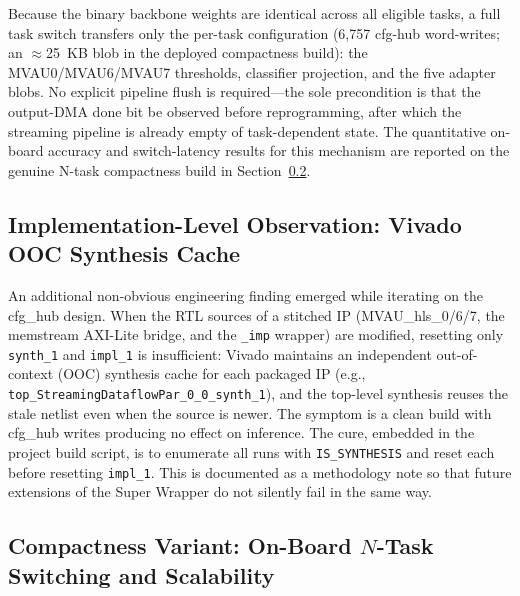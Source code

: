 \documentclass[12pt, a4paper]{report}
\numberwithin{equation}{chapter}
\numberwithin{figure}{chapter}
\numberwithin{table}{chapter}
\numberwithin{algorithm}{chapter}
\begin{document}
Because the binary backbone weights are identical across all eligible tasks, a full task switch transfers only the per-task configuration (6{,}757 cfg-hub word-writes; an $\approx$25~KB blob in the deployed compactness build): the MVAU0/MVAU6/MVAU7 thresholds, classifier projection, and the five adapter blobs. No explicit pipeline flush is required---the sole precondition is that the output-DMA done bit be observed before reprogramming, after which the streaming pipeline is already empty of task-dependent state. The quantitative on-board accuracy and switch-latency results for this mechanism are reported on the genuine N-task compactness build in Section~\ref{sec:pe1_3ds}.

\subsection{Implementation-Level Observation: Vivado OOC Synthesis Cache}

An additional non-obvious engineering finding emerged while iterating on the cfg\_hub design. When the RTL sources of a stitched IP (MVAU\_hls\_0/6/7, the memstream AXI-Lite bridge, and the \texttt{\_imp} wrapper) are modified, resetting only \texttt{synth\_1} and \texttt{impl\_1} is insufficient: Vivado maintains an independent out-of-context (OOC) synthesis cache for each packaged IP (e.g., \texttt{top\_StreamingDataflowPar\_0\_0\_synth\_1}), and the top-level synthesis reuses the stale netlist even when the source is newer. The symptom is a clean build with cfg\_hub writes producing no effect on inference. The cure, embedded in the project build script, is to enumerate all runs with \texttt{IS\_SYNTHESIS} and reset each before resetting \texttt{impl\_1}. This is documented as a methodology note so that future extensions of the Super Wrapper do not silently fail in the same way.

\subsection{Compactness Variant: On-Board \texorpdfstring{$N$}{N}-Task Switching and Scalability}
\label{sec:pe1_3ds}
\end{document}
